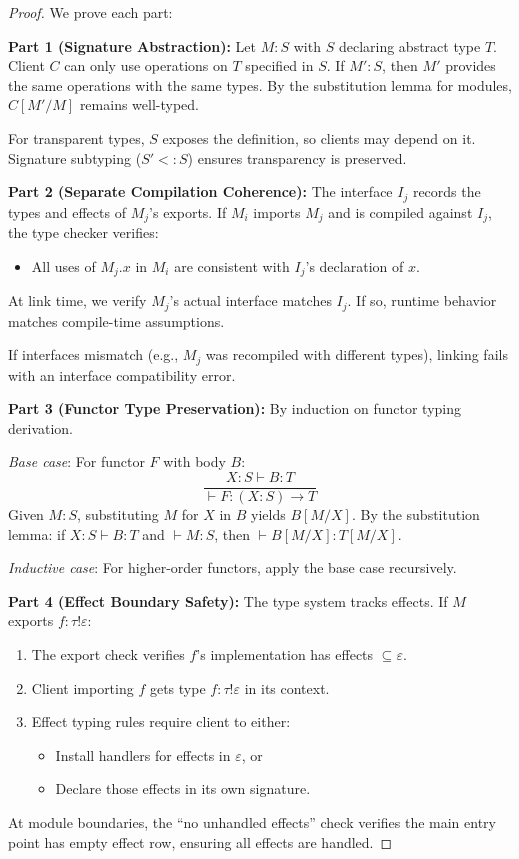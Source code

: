 \begin{proof}
We prove each part:

\textbf{Part 1 (Signature Abstraction):}
Let $M : S$ with $S$ declaring abstract type $T$. Client $C$ can only use operations on $T$ specified in $S$. If $M' : S$, then $M'$ provides the same operations with the same types. By the substitution lemma for modules, $C[M'/M]$ remains well-typed.

For transparent types, $S$ exposes the definition, so clients may depend on it. Signature subtyping ($S' <: S$) ensures transparency is preserved.

\textbf{Part 2 (Separate Compilation Coherence):}
The interface $I_j$ records the types and effects of $M_j$'s exports. If $M_i$ imports $M_j$ and is compiled against $I_j$, the type checker verifies:
\begin{itemize}
  \item All uses of $M_j.x$ in $M_i$ are consistent with $I_j$'s declaration of $x$.
\end{itemize}
At link time, we verify $M_j$'s actual interface matches $I_j$. If so, runtime behavior matches compile-time assumptions.

If interfaces mismatch (e.g., $M_j$ was recompiled with different types), linking fails with an interface compatibility error.

\textbf{Part 3 (Functor Type Preservation):}
By induction on functor typing derivation.

\emph{Base case}: For functor $F$ with body $B$:
\[
\frac{X : S \vdash B : T}{\vdash F : (X : S) \to T}
\]
Given $M : S$, substituting $M$ for $X$ in $B$ yields $B[M/X]$.
By the substitution lemma: if $X : S \vdash B : T$ and $\vdash M : S$, then $\vdash B[M/X] : T[M/X]$.

\emph{Inductive case}: For higher-order functors, apply the base case recursively.

\textbf{Part 4 (Effect Boundary Safety):}
The type system tracks effects. If $M$ exports $f : \tau \mathbin{!} \varepsilon$:
\begin{enumerate}
  \item The export check verifies $f$'s implementation has effects $\subseteq \varepsilon$.
  \item Client importing $f$ gets type $f : \tau \mathbin{!} \varepsilon$ in its context.
  \item Effect typing rules require client to either:
    \begin{itemize}
      \item Install handlers for effects in $\varepsilon$, or
      \item Declare those effects in its own signature.
    \end{itemize}
\end{enumerate}
At module boundaries, the ``no unhandled effects'' check verifies the main entry point has empty effect row, ensuring all effects are handled.
\end{proof}

